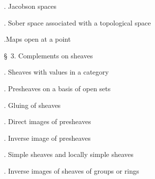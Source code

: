 \noindent{}. Jacobson spaces\dotfill

\noindent{}. Sober space associated with a topological space\dotfill

\noindent{}.Maps open at a point \dotfill

\noindent\quad \S\ 3. Complements on sheaves\dotfill

\noindent{}. Sheaves with values in a category\dotfill

\noindent{}. Presheaves on a basis of open sets\dotfill

\noindent{}. Gluing of sheaves\dotfill

\noindent{}. Direct images of presheaves\dotfill

\noindent{}. Inverse image of presheaves\dotfill

\noindent{}. Simple sheaves and locally simple sheaves\dotfill

\noindent{}. Inverse images of sheaves of groups or rings\dotfill

\clearpage
